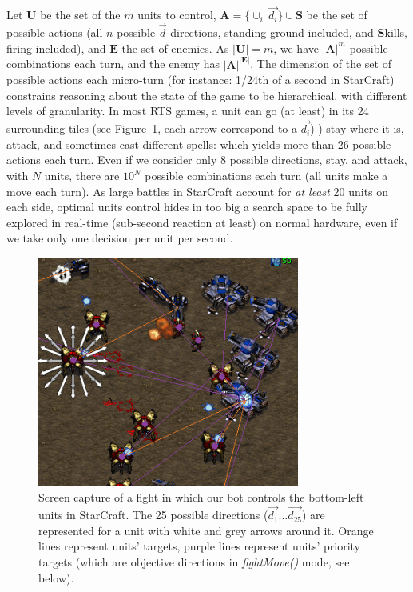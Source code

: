 Let $\mathbf{U}$ be the set of the $m$ units to control, $\mathbf{A} = \{\cup_i\ \vec{d_i}\} \cup \mathbf{S}$ be the set of possible actions (all $n$ possible $\vec{d}$ directions, standing ground included, and $\mathbf{S}$kills, firing included), and $\mathbf{E}$ the set of enemies. As $|\mathbf{U}| = m$, we have $|\mathbf{A}|^{m}$ possible combinations each turn, and the enemy has $|\mathbf{A}|^{|\mathbf{E}|}$. 
The dimension of the set of possible actions each micro-turn (for instance: 1/24th of a second in StarCraft) constrains reasoning about the state of the game to be hierarchical, with different levels of granularity. In most RTS games, a unit can go (at least) in its 24 surrounding tiles (see Figure~\ref{fig:sc_fight}, each arrow correspond to a $\vec{d_i}$)
) %
stay where it is, attack, and sometimes cast different spells: which yields more than 26 possible actions each turn. Even if we consider only 8 possible directions, stay, and attack, with $N$ units, there are $10^N$ possible combinations each turn (all units make a move each turn). As large battles in StarCraft account for \textit{at least} 20 units on each side, optimal units control hides in too big a search space to be fully explored in real-time (sub-second reaction at least) on normal hardware, even if we take only one decision per unit per second.

\begin{figure}
\begin{center}
\includegraphics[width=8.6cm]{images/SC_fight_3b.png}
\end{center}
\caption{Screen capture of a fight in which our bot controls the bottom-left units in StarCraft. The 25 possible directions ($\vec{d_1} \dots \vec{d_{25}}$) are represented for a unit with white and grey arrows around it. Orange lines represent units' targets, purple lines represent units' priority targets (which are objective directions in \textit{fightMove()} mode, see below).}
\label{fig:sc_fight}
\end{figure}

